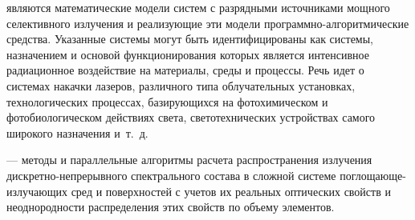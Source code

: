 




 являются математические модели систем с разрядными источниками мощного селективного излучения и реализующие эти модели программно-алгоритмические средства.
Указанные системы могут быть идентифицированы как системы, назначением и основой функционирования которых является интенсивное радиационное воздействие на материалы, среды и процессы.
Речь идет о системах накачки лазеров, различного типа облучательных установках, технологических процессах, базирующихся на фотохимическом и фотобиологическом действиях света, светотехнических устройствах самого широкого назначения и~т.~д.

 — методы и параллельные алгоритмы расчета распространения излучения дискретно-непрерывного спектрального состава в сложной системе поглощающе-излучающих сред и поверхностей с учетов их реальных оптических свойств и неоднородности распределения этих свойств по объему элементов.


